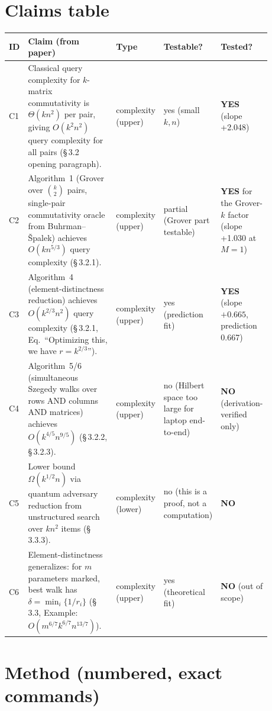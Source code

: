 \documentclass[11pt,letterpaper]{article}
\begin{document}
\section{Claims table}
\label{sec:claims}

\begin{longtable}{@{}p{0.05\linewidth}p{0.42\linewidth}p{0.15\linewidth}p{0.13\linewidth}p{0.13\linewidth}@{}}
\toprule
ID & Claim (from paper) & Type & Testable? & Tested? \\
\midrule
C1 & Classical query complexity for $k$-matrix commutativity is $\Theta(k n^2)$ per pair, giving $O(k^2 n^2)$ query complexity for all pairs (\S\,3.2 opening paragraph). & complexity (upper) & yes (small $k, n$) & \textbf{YES} (slope +2.048) \\
C2 & Algorithm~1 (Grover over $\binom{k}{2}$ pairs, single-pair commutativity oracle from Buhrman--\v{S}palek) achieves $O(k n^{5/3})$ query complexity (\S\,3.2.1). & complexity (upper) & partial (Grover part testable) & \textbf{YES} for the Grover-$k$ factor (slope +1.030 at $M=1$) \\
C3 & Algorithm~4 (element-distinctness reduction) achieves $O(k^{2/3} n^2)$ query complexity (\S\,3.2.1, Eq.~``Optimizing this, we have $r = k^{2/3}$''). & complexity (upper) & yes (prediction fit) & \textbf{YES} (slope $+0.665$, prediction 0.667) \\
C4 & Algorithm~5/6 (simultaneous Szegedy walks over rows AND columns AND matrices) achieves $O(k^{4/5} n^{9/5})$ (\S\,3.2.2, \S\,3.2.3). & complexity (upper) & no (Hilbert space too large for laptop end-to-end) & \textbf{NO} (derivation-verified only) \\
C5 & Lower bound $\Omega(k^{1/2} n)$ via quantum adversary reduction from unstructured search over $kn^2$ items (\S\,3.3.3). & complexity (lower) & no (this is a proof, not a computation) & \textbf{NO} \\
C6 & Element-distinctness generalizes: for $m$ parameters marked, best walk has $\delta = \min_i \{1/r_i\}$ (\S\,3.3, Example: $O(m^{6/7} k^{6/7} n^{13/7})$). & complexity (upper) & yes (theoretical fit) & \textbf{NO} (out of scope) \\
\bottomrule
\end{longtable}

\section{Method (numbered, exact commands)}
\label{sec:method}
\end{document}
